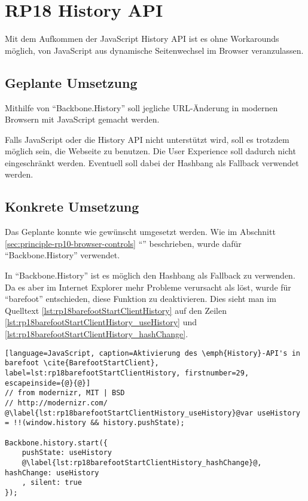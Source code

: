 \section{RP18 History API}
\label{sec:principle-rp18-history-api}

Mit dem Aufkommen der JavaScript History API \cite{HistoryAPI} ist es ohne Workarounds möglich, von JavaScript aus dynamische Seitenwechsel im Browser veranzulassen.

\subsection*{Geplante Umsetzung}
Mithilfe von ``Backbone.History'' \cite{BackbonejsHistory} soll jegliche URL-Änderung in modernen Browsern mit JavaScript gemacht werden.

Falls JavaScript oder die History API nicht unterstützt wird, soll es trotzdem möglich sein, die Webseite zu benutzen. Die User Experience soll dadurch nicht eingeschränkt werden. Eventuell soll dabei der \gls{Hashbang} als Fallback verwendet werden.

\subsection*{Konkrete Umsetzung}
Das Geplante konnte wie gewünscht umgesetzt werden. Wie im Abschnitt \ref{sec:principle-rp10-browser-controls} ``'' beschrieben, wurde dafür ``Backbone.History'' verwendet.

In ``Backbone.History'' ist es möglich den Hashbang als Fallback zu verwenden. Da es aber im Internet Explorer mehr Probleme verursacht als löst, wurde für ``barefoot'' entschieden, diese Funktion zu deaktivieren. Dies sieht man im Quelltext \ref{lst:rp18barefootStartClientHistory} auf den Zeilen \ref{lst:rp18barefootStartClientHistory_useHistory} und \ref{lst:rp18barefootStartClientHistory_hashChange}.

\begin{lstlisting}[language=JavaScript, caption=Aktivierung des \emph{History}-API's in barefoot \cite{BarefootStartClient}, label=lst:rp18barefootStartClientHistory, firstnumber=29, escapeinside={@}{@}]
// from modernizr, MIT | BSD
// http://modernizr.com/
@\label{lst:rp18barefootStartClientHistory_useHistory}@var useHistory = !!(window.history && history.pushState);

Backbone.history.start({
	pushState: useHistory
	@\label{lst:rp18barefootStartClientHistory_hashChange}@, hashChange: useHistory
	, silent: true
});
\end{lstlisting}

